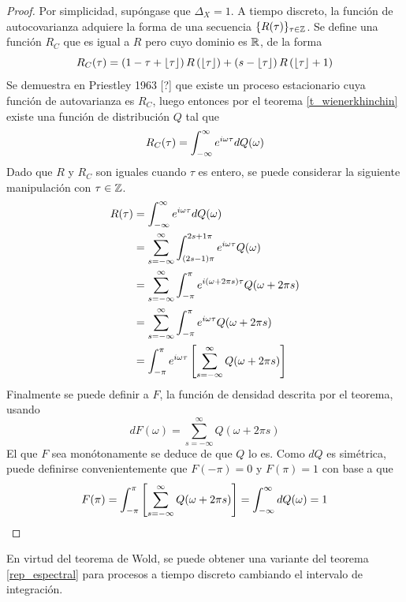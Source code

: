 \begin{proof}
Por simplicidad, supóngase que $\Delta_X=1$. A tiempo discreto, la función de autocovarianza adquiere la forma de una secuencia $\{R(\tau)\}_{\tau\in \mathbb{Z}}$. Se define una función $R_C$ que es igual a $R$ pero cuyo dominio es $\mathbb{R}$, de la forma
\begin{equation}
R_C(\tau) = \left( 1 - \tau + \left\lfloor \tau \right\rfloor \right) R\left( \left\lfloor \tau \right\rfloor \right) +
\left( s - \left\lfloor \tau \right\rfloor \right) R\left( \left\lfloor \tau \right\rfloor +1 \right)
\end{equation}
Se demuestra en Priestley 1963 [?] que existe un proceso estacionario cuya función de autovarianza es $R_C$, luego entonces por el teorema \ref{t_wienerkhinchin} existe una función de distribución $Q$ tal que 
\begin{equation}
R_C(\tau) = \int_{-\infty}^{\infty} e^{i \omega \tau} dQ(\omega)
\end{equation}
Dado que $R$ y $R_C$ son iguales cuando $\tau$ es entero, se puede considerar la siguiente manipulación con $\tau \in \mathbb{Z}$.
\begin{align*}
R(\tau) &= 
\int_{-\infty}^{\infty} e^{i \omega \tau} dQ(\omega) \\
&=
\sum_{s = -\infty}^{\infty} \int_{(2s-1)\pi}^{2s+1 \pi} e^{i \omega \tau} Q(\omega) \\
&=
\sum_{s = -\infty}^{\infty} \int_{-\pi}^{\pi} e^{i \left(\omega + 2\pi s \right) \tau} Q(\omega + 2 \pi s) \\
&=
\sum_{s = -\infty}^{\infty} \int_{-\pi}^{\pi} e^{i \omega \tau} Q(\omega + 2 \pi s) \\
&=
\int_{-\pi}^{\pi} e^{i \omega \tau} \left[ \sum_{s = -\infty}^{\infty} Q(\omega + 2 \pi s) \right] \\
\end{align*}
Finalmente se puede definir a $F$, la función de densidad descrita por el teorema, usando
\begin{equation}
dF(\omega) = \sum_{s = -\infty}^{\infty} Q(\omega + 2 \pi s)
\end{equation}
El que $F$ sea monótonamente se deduce de que $Q$ lo es. Como $dQ$ es simétrica, puede definirse convenientemente que $F(-\pi)=0$ y $F(\pi) = 1$ con base a que
\begin{equation}
F(\pi) = \int_{-\pi}^{\pi} \left[ \sum_{s = -\infty}^{\infty} Q(\omega + 2 \pi s) \right] = \int_{-\infty}^{\infty} dQ(\omega) = 1
\end{equation}
\end{proof}

En virtud del teorema de Wold, se puede obtener una variante del teorema \ref{rep_espectral} para procesos a tiempo discreto cambiando el intervalo de integración.

